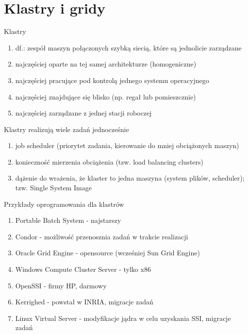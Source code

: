 \documentclass{beamer}
\begin{document}
\section{Klastry i gridy}

\begin{frame}{Klastry}
  \begin{enumerate}
  \item df.: zespół maszyn połączonych szybką siecią, które są jednolicie zarządzane
  \item najczęściej oparte na tej samej architekturze (homogeniczne)
  \item najczęściej pracujące pod kontrolą jednego systemu operacyjnego
  \item najczęściej znajdujące się blisko (np. regał lub pomieszcznie)
  \item najczęściej zarządzane z jednej stacji roboczej
  \end{enumerate}
\end{frame}

\begin{frame}{Klastry realizują wiele zadań jednocześnie}
  \begin{enumerate}
  \item job scheduler (priorytet zadania, kierowanie do mniej obciążonych maszyn)
  \item konieczność mierzenia obciążenia (tzw. load balancing clusters)
  \item dążenie do wrażenia, że klaster to jedna maszyna (system plików, scheduler); tzw. Single System Image
  \end{enumerate}
\end{frame}

\begin{frame}{Przykłady oprogramowania dla klastrów}
  \begin{enumerate}
  \item Portable Batch System - najstarszy
  \item Condor - możliwość przenosznia zadań w trakcie realizacji
  \item Oracle Grid Engine - opensource (wcześniej Sun Grid Engine)
  \item Windows Compute Cluster Server - tylko x86
  \item OpenSSI - firmy HP, darmowy
  \item Kerrighed - powstał w INRIA, migracje zadań
  \item Linux Virtual Server - modyfikacje jądra w celu uzyskania SSI, migracje zadań
  \end{enumerate}
\end{frame}
\end{document}
